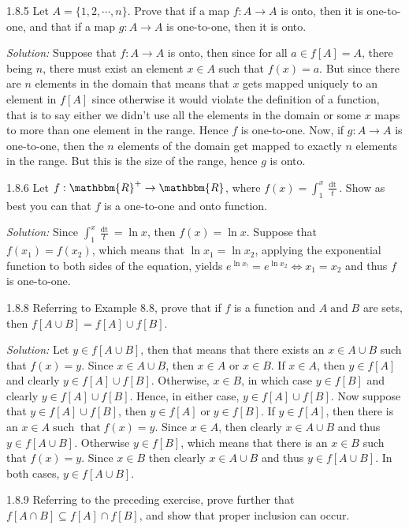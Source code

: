 \documentclass{letter}
\newcommand{\tmop}[1]{\ensuremath{\operatorname{#1}}}
\newcommand{\tmtextit}[1]{{\itshape{#1}}}
\begin{document}
1.8.5 Let $A =\{1, 2, \cdots, n\}$. Prove that if a map $f : A \rightarrow A$
is onto, then it is one-to-one, and that if a map $g : A \rightarrow A$ is
one-to-one, then it is onto.

\tmtextit{Solution:} Suppose that $f : A \rightarrow A$ is onto, then since
for all $a \in f [A] = A$, there being $n$, there must exist an element $x \in
A$ such that $f (x) = a$. But since there are $n$ elements in the domain that
means that $x$ gets mapped uniquely to an element in $f [A]$ since otherwise
it would violate the definition of a function, that is to say either we didn't
use all the elements in the domain or some $x$ maps to more than one element
in the range. Hence $f$ is one-to-one. Now, if $g : A \rightarrow A$ is
one-to-one, then the $n$ elements of the domain get mapped to exactly $n$
elements in the range. But this is the size of the range, hence $g$ is onto.

1.8.6 Let $f : \mathbbm{R}^+ \rightarrow \mathbbm{R}$, where $f (x) = \int_1^x
\frac{\tmop{dt}}{t}$. Show as best you can that $f$ is a one-to-one and onto
function.

\tmtextit{Solution:} Since $\int^x_1 \frac{\tmop{dt}}{t} = \ln x$, then $f (x)
= \ln x$. Suppose that $f (x_1) = f (x_2)$, which means that $\ln x_1 = \ln
x_2$, applying the exponential function to both sides of the equation, yields
$e^{\ln x_!} = e^{\ln x_2} \Leftrightarrow x_1 = x_2$ and thus $f$ is
one-to-one. \

1.8.8 Referring to Example 8.8, prove that if $f$ is a function and $A
\tmop{and} B$ are sets, then $f [A \cup B] = f [A] \cup f [B]$.

\tmtextit{Solution:} Let $y \in f [A \cup B]$, then that means that there
exists an $x \in A \cup B$ such that $f (x) = y$. Since $x \in A \cup B$, then
$x \in A$ or $x \in B$. If $x \in A$, then $y \in f [A]$ and clearly $y \in f
[A] \cup f [B]$. Otherwise, $x \in B$, in which case $y \in f [B]$ and clearly
$y \in f [A] \cup f [B]$. Hence, in either case, $y \in f [A] \cup f [B]$. Now
suppose that $y \in f [A] \cup f [B]$, then $y \in f [A] \tmop{or} y \in f
[B]$. If $y \in f [A]$, then there is an $x \in A \tmop{such} \tmop{that} f
(x) = y$. Since $x \in A$, then clearly $x \in A \cup B$ and thus $y \in f [A
\cup B]$. Otherwise $y \in f [B]$, which means that there is an $x \in B$ such
that $f (x) = y$. Since $x \in B$ then clearly $x \in A \cup B$ and thus $y
\in f [A \cup B]$. In both cases, $y \in f [A \cup B]$.

1.8.9 Referring to the preceding exercise, prove further that $f [A \cap B]
\subseteq f [A] \cap f [B]$, and show that proper inclusion can occur.
\end{document}
